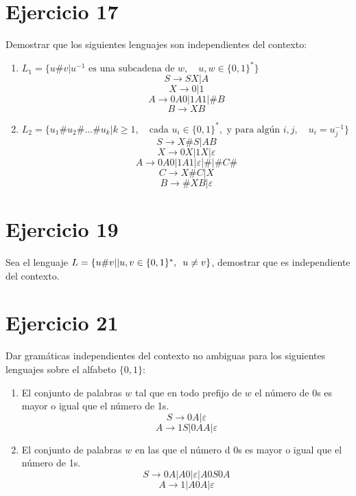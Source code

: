 \documentclass[a4paper, 11pt]{article}
\begin{document}
\section*{Ejercicio 17}
Demostrar que los siguientes lenguajes son independientes del contexto:
\begin{enumerate}
\item $L_1=\{u\#v|u^{-1} \text{ es una subcadena de }w, \quad u,w\in\{0,1\}^*\}$
\[S\longrightarrow SX|A\]
\[X\longrightarrow 0|1\]
\[A\longrightarrow 0A0|1A1|\#B\]
\[B\longrightarrow XB\]
\item $L_2=\{u_1\# u_2\# ...\# u_k|k\geq 1, \quad \text{cada } u_i\in\{0,1\}^*, \text{ y para algún }i,j, \quad u_i=u_j^{-1}\}$
\[ S\longrightarrow X\#S|AB\]
\[ X\longrightarrow 0X|1X|\varepsilon \]
\[ A\longrightarrow 0A0|1A1|\varepsilon|\#|\#C\#\]
\[ C\longrightarrow X\#C|X\]
\[ B\longrightarrow \#XB|\varepsilon\]
\end{enumerate}
\section*{Ejercicio 19}
Sea el lenguaje $L=\{u\#v||u,v\in\{0,1\}^*, \enskip u\neq v \}$, demostrar que es independiente del contexto.
\section*{Ejercicio 21}
Dar gramáticas independientes del contexto no ambiguas para los siguientes lenguajes sobre el alfabeto $\{0,1\}$:
\begin{enumerate}
\item  El conjunto de palabras $w$ tal que en todo prefijo de $w$ el número de 0s es mayor o igual que el número de 1s.
\[ S\longrightarrow 0A|\varepsilon\]
\[ A\longrightarrow 1S|0AA|\varepsilon\]
\item El conjunto de palabras $w$ en las que el número d 0s es mayor o igual que el número de 1s.
\[ S\longrightarrow 0A|A0|\varepsilon|A0S0A\]
\[ A\longrightarrow 1|A0A|\varepsilon\]
\end{enumerate}
\end{document}
